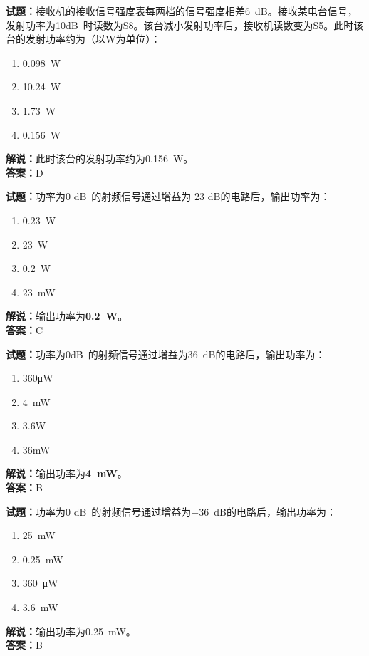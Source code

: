 \documentclass{ctexbook}
\begin{document}
\vspace{1em}

\textbf{试题：}接收机的接收信号强度表每两档的信号强度相差\SI{6}{\dB}。接收某电台信号，发射功率为10\unit[qualifier-mode=combine]{\deci\bel{}}时读数为S8。该台减小发射功率后，接收机读数变为S5。此时该台的发射功率约为（以\si{\W}为单位）：
\begin{enumerate}[leftmargin=3em]
  \item \SI{0.098}{\W}
  \item \SI{10.24}{\W}
  \item \SI{1.73}{\W}
  \item \SI{0.156}{\W}
\end{enumerate}
\noindent\textbf{解说：}此时该台的发射功率约为\SI{0.156}{\W}。\\\noindent\textbf{答案：}D

\vspace{1em}

\textbf{试题：}功率为\num{0} \unit[qualifier-mode=combine]{\deci\bel{}}的射频信号通过增益为 23 dB的电路后，输出功率为：
\begin{enumerate}[leftmargin=3em]
  \item \SI{0.23}{\W}
  \item \SI{23}{\W}
  \item \SI{0.2}{\W}
  \item \SI{23}{\mW}
\end{enumerate}
\noindent\textbf{解说：}输出功率为\textbf{\SI{0.2}{\W}}。\\\noindent\textbf{答案：}C

\vspace{1em}

\textbf{试题：}功率为\num{0}\unit[qualifier-mode=combine]{\deci\bel{}}的射频信号通过增益为\SI{36}{\dB}的电路后，输出功率为：
\begin{enumerate}[leftmargin=3em]
  \item 360μW
  \item \SI{4}{\mW}
  \item 3.6W
  \item 36mW
\end{enumerate}
\noindent\textbf{解说：}输出功率为\textbf{\SI{4}{\mW}}。\\\noindent\textbf{答案：}B

\vspace{1em}

\textbf{试题：}功率为\num{0} \unit[qualifier-mode=combine]{\deci\bel{}}的射频信号通过增益为\SI{-36}{\dB}的电路后，输出功率为：
\begin{enumerate}[leftmargin=3em]
  \item \SI{25}{\mW}
  \item \SI{0.25}{\mW}
  \item \SI{360}{\uW}
  \item \SI{3.6}{\mW}
\end{enumerate}
\noindent\textbf{解说：}输出功率为\SI{0.25}{\mW}。\\
\noindent\textbf{答案：}B
\end{document}
